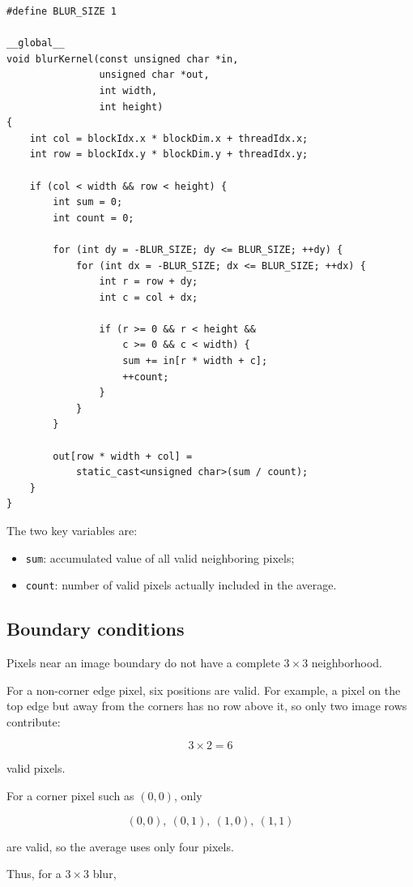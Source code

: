 \documentclass[11pt,a4paper]{article}
\begin{document}
\begin{lstlisting}
#define BLUR_SIZE 1

__global__
void blurKernel(const unsigned char *in,
                unsigned char *out,
                int width,
                int height)
{
    int col = blockIdx.x * blockDim.x + threadIdx.x;
    int row = blockIdx.y * blockDim.y + threadIdx.y;

    if (col < width && row < height) {
        int sum = 0;
        int count = 0;

        for (int dy = -BLUR_SIZE; dy <= BLUR_SIZE; ++dy) {
            for (int dx = -BLUR_SIZE; dx <= BLUR_SIZE; ++dx) {
                int r = row + dy;
                int c = col + dx;

                if (r >= 0 && r < height &&
                    c >= 0 && c < width) {
                    sum += in[r * width + c];
                    ++count;
                }
            }
        }

        out[row * width + col] =
            static_cast<unsigned char>(sum / count);
    }
}
\end{lstlisting}

The two key variables are:

\begin{itemize}
    \item \texttt{sum}: accumulated value of all valid neighboring pixels;
    \item \texttt{count}: number of valid pixels actually included in the average.
\end{itemize}

\subsection{Boundary conditions}

Pixels near an image boundary do not have a complete \(3\times3\) neighborhood.

For a non-corner edge pixel, six positions are valid. For example, a pixel on the top edge but away from the corners has no row above it, so only two image rows contribute:

\[
3\times2=6
\]

valid pixels.

For a corner pixel such as \((0,0)\), only

\[
(0,0),\ (0,1),\ (1,0),\ (1,1)
\]

are valid, so the average uses only four pixels.

Thus, for a \(3\times3\) blur,
\end{document}

